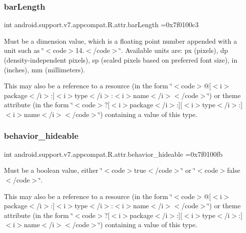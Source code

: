 \subsubsection{\texorpdfstring{bar\+Length}{barLength}}
{\footnotesize\ttfamily int android.\+support.\+v7.\+appcompat.\+R.\+attr.\+bar\+Length =0x7f0100c3\hspace{0.3cm}{\ttfamily [static]}}

Must be a dimension value, which is a floating point number appended with a unit such as \char`\"{}$<$code$>$14.\+5sp$<$/code$>$\char`\"{}. Available units are\+: px (pixels), dp (density-\/independent pixels), sp (scaled pixels based on preferred font size), in (inches), mm (millimeters). 

This may also be a reference to a resource (in the form \char`\"{}$<$code$>$@\mbox{[}$<$i$>$package$<$/i$>$\+:\mbox{]}$<$i$>$type$<$/i$>$\+:$<$i$>$name$<$/i$>$$<$/code$>$\char`\"{}) or theme attribute (in the form \char`\"{}$<$code$>$?\mbox{[}$<$i$>$package$<$/i$>$\+:\mbox{]}\mbox{[}$<$i$>$type$<$/i$>$\+:\mbox{]}$<$i$>$name$<$/i$>$$<$/code$>$\char`\"{}) containing a value of this type. \mbox{\label{classandroid_1_1support_1_1v7_1_1appcompat_1_1R_1_1attr_a87f1263041e8659e9a13195dc36cca7f}} 
\subsubsection{\texorpdfstring{behavior\+\_\+hideable}{behavior\_hideable}}
{\footnotesize\ttfamily int android.\+support.\+v7.\+appcompat.\+R.\+attr.\+behavior\+\_\+hideable =0x7f0100fb\hspace{0.3cm}{\ttfamily [static]}}

Must be a boolean value, either \char`\"{}$<$code$>$true$<$/code$>$\char`\"{} or \char`\"{}$<$code$>$false$<$/code$>$\char`\"{}. 

This may also be a reference to a resource (in the form \char`\"{}$<$code$>$@\mbox{[}$<$i$>$package$<$/i$>$\+:\mbox{]}$<$i$>$type$<$/i$>$\+:$<$i$>$name$<$/i$>$$<$/code$>$\char`\"{}) or theme attribute (in the form \char`\"{}$<$code$>$?\mbox{[}$<$i$>$package$<$/i$>$\+:\mbox{]}\mbox{[}$<$i$>$type$<$/i$>$\+:\mbox{]}$<$i$>$name$<$/i$>$$<$/code$>$\char`\"{}) containing a value of this type. \mbox{\label{classandroid_1_1support_1_1v7_1_1appcompat_1_1R_1_1attr_a53ab63799d595c3c29a56e8c4364acd3}} 
